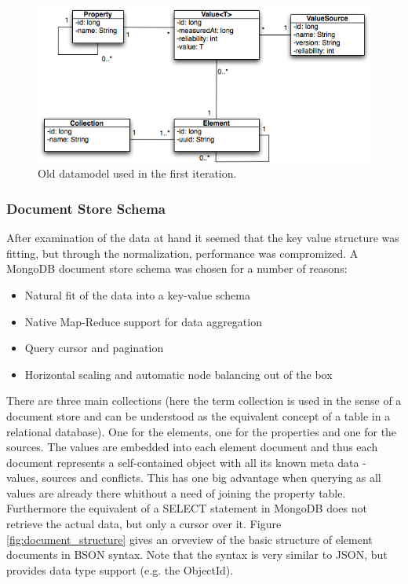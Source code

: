 \begin{figure}[htb]
\begin{center}
\includegraphics[width=5in]{figures/architecture/old_datamodel.png}
\caption{Old datamodel used in the first iteration.}
\label{fig:old_datamodel}
\end{center}
\end{figure}

\subsubsection{Document Store Schema}
After examination of the data at hand it seemed that the key value structure was fitting, but through the normalization, performance was compromized. A MongoDB document store schema was chosen for a number of reasons:
\begin{itemize}
\item Natural fit of the data into a key-value schema
\item Native Map-Reduce support for data aggregation
\item Query cursor and pagination
\item Horizontal scaling and automatic node balancing out of the box
\end{itemize}

There are three main collections (here the term collection is used in the sense of a document store and can be understood as the equivalent concept of a table in a relational database). One for the elements, one for the properties and one for the sources. The values are embedded into each element document and thus each document represents a self-contained object with all its known meta data - values, sources and conflicts. This has one big advantage when querying as all values are already there whithout a need of joining the property table. Furthermore the equivalent of a SELECT statement in MongoDB does not retrieve the actual data, but only a cursor over it.
Figure \ref{fig:document_structure} gives an orveview of the basic structure of element documents in BSON syntax. Note that the syntax is very similar to JSON, but provides data type support (e.g. the ObjectId).

